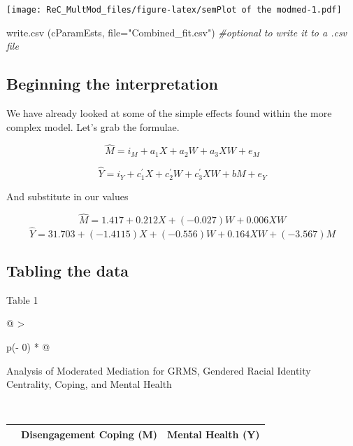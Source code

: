 \documentclass[
  11pt,
]{book}
\newenvironment{Shaded}{\begin{snugshade}}{\end{snugshade}}
\newcommand{\AttributeTok}[1]{\textcolor[rgb]{0.77,0.63,0.00}{#1}}
\newcommand{\CommentTok}[1]{\textcolor[rgb]{0.56,0.35,0.01}{\textit{#1}}}
\newcommand{\FunctionTok}[1]{\textcolor[rgb]{0.00,0.00,0.00}{#1}}
\newcommand{\NormalTok}[1]{#1}
\newcommand{\StringTok}[1]{\textcolor[rgb]{0.31,0.60,0.02}{#1}}
\begin{document}
\texttt{[image: ReC\_MultMod\_files/figure-latex/semPlot of the modmed-1.pdf]}

\begin{Shaded}
\begin{Highlighting}[]
\FunctionTok{write.csv}\NormalTok{ (cParamEsts, }\AttributeTok{file=}\StringTok{"Combined\_fit.csv"}\NormalTok{) }\CommentTok{\#optional to write it to a .csv file}
\end{Highlighting}
\end{Shaded}

\hypertarget{beginning-the-interpretation}{%
\subsection{Beginning the interpretation}\label{beginning-the-interpretation}}

We have already looked at some of the simple effects found within the more complex model. Let's grab the formulae.

\[\hat{M} = i_{M}+a_{1}X + a_{2}W + a_{3}XW + e_{M}\]

\[\hat{Y} = i_{Y}+c_{1}^{'}X+ c_{2}^{'}W+c_{3}^{'}XW+ bM+e_{Y}\]

And substitute in our values

\[\hat{M} = 1.417 + 0.212X + (-0.027) W + 0.006XW\]
\[\hat{Y} = 31.703 + (-1.4115)X + (-0.556)W + 0.164XW + (-3.567)M\]

\hypertarget{tabling-the-data-1}{%
\subsection{Tabling the data}\label{tabling-the-data-1}}

Table 1

\begin{longtable}[]{@{}
  >{\raggedright\arraybackslash}p{(\columnwidth - 0\tabcolsep) * }@{}}
\toprule
\begin{minipage}[b]{\linewidth}\raggedright
Analysis of Moderated Mediation for GRMS, Gendered Racial Identity Centrality, Coping, and Mental Health
\end{minipage} \\
\midrule
\endhead
\bottomrule
\end{longtable}

\begin{longtable}[]{@{}
  >{\raggedright\arraybackslash}p{}
  >{\centering\arraybackslash}p{}
  >{\centering\arraybackslash}p{}@{}}
\toprule
\endhead
& Disengagement Coping (M) & Mental Health (Y) \\
\bottomrule
\end{longtable}
\end{document}

